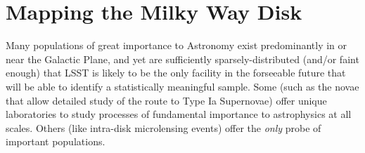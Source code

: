%
%
%
%
%
%
%

\section{Mapping the Milky Way Disk}
\def\secname{MW_Disk}\label{sec:\secname} %




Many populations of great importance to Astronomy exist predominantly
in or near the Galactic Plane, and yet are sufficiently
sparsely-distributed (and/or faint enough) that LSST is likely to be
the only facility in the forseeable future that will be able to
identify a statistically meaningful sample. Some (such as the novae
that allow detailed study of the route to Type Ia Supernovae) offer
unique laboratories to study processes of fundamental importance to
astrophysics at all scales. Others (like intra-disk microlensing
events) offer the {\it only} probe of important populations. 

